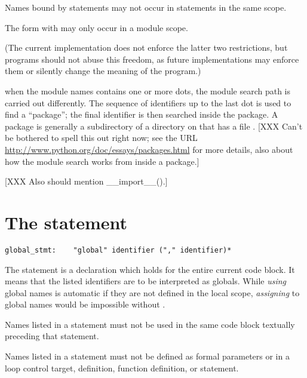 Names bound by  statements may not occur in
 statements in the same scope.

The  form with \samp{*} may only occur in a module scope.

(The current implementation does not enforce the latter two
restrictions, but programs should not abuse this freedom, as future
implementations may enforce them or silently change the meaning of the
program.)

when the module names contains one or more dots, the module search
path is carried out differently.  The sequence of identifiers up to
the last dot is used to find a ``package''; the final
identifier is then searched inside the package.  A package is
generally a subdirectory of a directory on  that has a
file .
%
[XXX Can't be bothered to spell this out right now; see the URL
\url{http://www.python.org/doc/essays/packages.html} for more details, also
about how the module search works from inside a package.]

[XXX Also should mention __import__().]

\section{The  statement \label{global}}

\begin{verbatim}
global_stmt:    "global" identifier ("," identifier)*
\end{verbatim}

The  statement is a declaration which holds for the
entire current code block.  It means that the listed identifiers are to be
interpreted as globals.  While \emph{using} global names is automatic
if they are not defined in the local scope, \emph{assigning} to global
names would be impossible without .

Names listed in a  statement must not be used in the same
code block textually preceding that  statement.

Names listed in a  statement must not be defined as formal
parameters or in a  loop control target, 
definition, function definition, or  statement.

